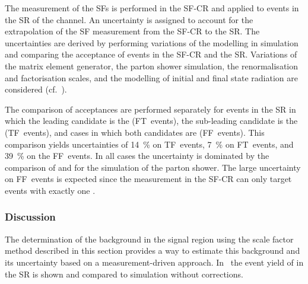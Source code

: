 

%   

The measurement of the SFs is performed in the SF-CR and applied to events in
the SR of the \hadhad channel. An uncertainty is assigned to account for the
extrapolation of the SF measurement from the SF-CR to the \hadhad SR. The
uncertainties are derived by performing variations of the \ttbar modelling in
simulation and comparing the acceptance of \ttbarFakes events in the SF-CR and
the \hadhad SR. Variations of the matrix element generator, the parton shower
simulation, the renormalisation and factorisation scales, and the modelling of
initial and final state radiation are considered
(cf.~).

The comparison of \ttbarFakes acceptances are performed separately for events in
the \hadhad SR in which the leading \tauhadvis candidate is the \faketauhadvis
(FT~events), the sub-leading \tauhadvis candidate is the \faketauhadvis
(TF~events), and cases in which both candidates are \faketauhadvis
(FF~events). This comparison yields uncertainties of \SI{14}{\percent} on
TF~events, \SI{7}{\percent} on FT~events, and \SI{39}{\percent} on the
FF~events. In all cases the uncertainty is dominated by the comparison of
\PYTHIA[8] and \HERWIG[7] for the simulation of the parton shower. The large
uncertainty on FF~events is expected since the measurement in the SF-CR can only
target events with exactly one \faketauhadvis.


\subsubsection{Discussion}

The determination of the \ttbarFakes background in the \hadhad signal region
using the scale factor method described in this section provides a way to
estimate this background and its uncertainty based on a measurement-driven
approach. In~ the event yield of \ttbarFakes in the
\hadhad SR is shown and compared to \ttbar simulation without corrections.


